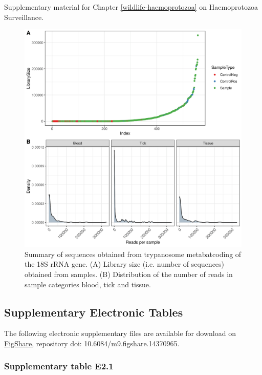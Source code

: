 \documentclass[a4paper, nobind]{templates/ociamthesis}
\begin{document}
Supplementary material for Chapter \ref{wildlife-haemoprotozoa} on Haemoprotozoa Surveillance.

\begin{figure}[h]
\includegraphics[width=0.95\linewidth]{figures/ms-figs-appendix/FigA-4.1} \caption[Sequence summary of trypanosome metabarcoding]{Summary of sequences obtained from trypanosome metabatcoding of the 18S rRNA gene. (A) Library size (i.e. number of sequences) obtained from samples. (B) Distribution of the number of reads in sample categories blood, tick and tissue.}\label{fig:FA41}
\end{figure}

\clearpage

\hypertarget{ch4-esupp}{%
\subsection{Supplementary Electronic Tables}\label{ch4-esupp}}

The following electronic supplementary files are available for download on \href{https://figshare.com/s/9eb3dba4096470af9904}{FigShare}, repository doi: 10.6084/m9.figshare.14370965.

\hypertarget{supplementary-table-e2.1}{%
\subsubsection{Supplementary table E2.1}\label{supplementary-table-e2.1}}
\end{document}
